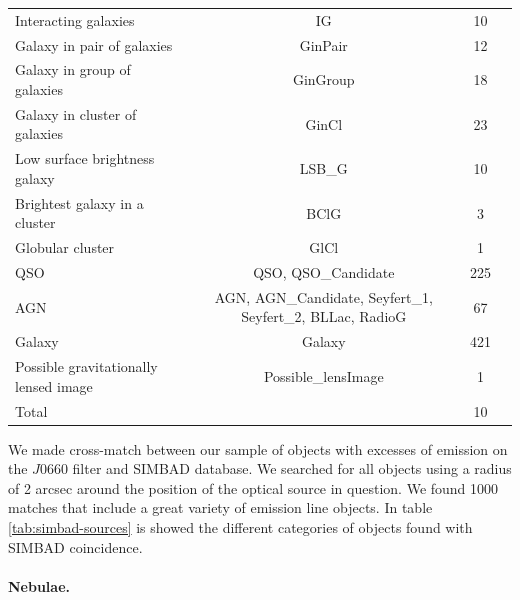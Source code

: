 \documentclass[fleqn,usenatbib]{mnras}
\begin{document}
\begin{table}
\begin{tabular}{lccc}
Interacting galaxies        & IG                     & 10                \\
Galaxy in pair of galaxies      & GinPair            & 12                \\
Galaxy in group of galaxies     & GinGroup           & 18                \\
Galaxy in cluster of galaxies   & GinCl              & 23                \\
Low surface brightness galaxy   & LSB\_G             & 10                \\
Brightest galaxy in a cluster   & BClG               & 3                 \\
Globular cluster            & GlCl                   & 1                 \\
QSO                         & QSO, QSO\_Candidate    & 225               \\
AGN                         & AGN, AGN\_Candidate, Seyfert\_1, Seyfert\_2, BLLac, RadioG  & 67  \\
Galaxy                      &  Galaxy                & 421               \\
Possible gravitationally lensed image & Possible\_lensImage & 1          \\
\hline
Total                       &                               & 10         \\
\hline
\end{tabular}
\end{table}

We made cross-match between our sample of objects with excesses of emission on
the $J$0660 filter and SIMBAD database. We searched for all objects using a radius of 2 arcsec
around the position of the optical source in question. We found 1000
matches that include a great variety of emission line objects. In table
\ref{tab:simbad-sources} is showed the different categories of objects found
with SIMBAD coincidence.

\paragraph{Nebulae.}
\end{document}
